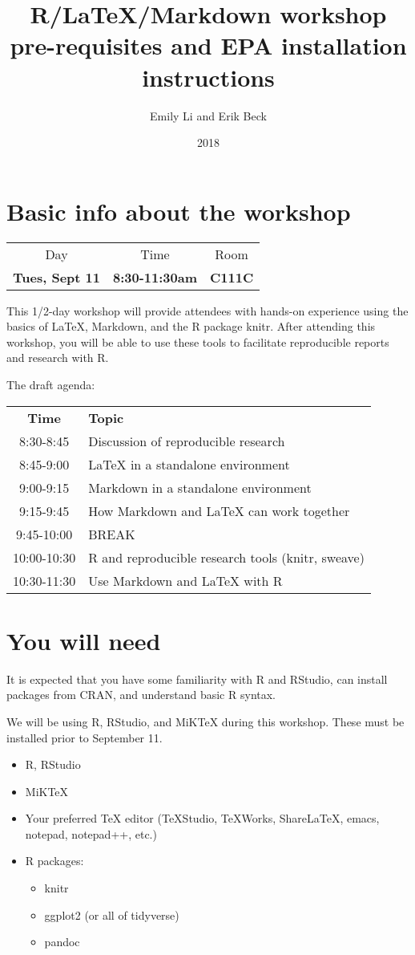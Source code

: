 \documentclass{article}
\title{R/LaTeX/Markdown workshop pre-requisites and EPA installation instructions}
\author{Emily Li and Erik Beck}
\date{2018}
\begin{document}
\maketitle
\tableofcontents

\section{Basic info about the workshop}
\begin{center}
    \begin{tabular}{c c c}
    Day & Time & Room \\
    \textbf{Tues, Sept 11} & \textbf{8:30-11:30am} & \textbf{C111C}
\end{tabular}
\end{center}

This 1/2-day workshop will provide attendees with hands-on experience
using the basics of LaTeX, Markdown, and the R package knitr. After
attending this workshop, you will be able to use these tools to
facilitate reproducible reports and research with R.

The draft agenda:

\begin{tabular}{c|l}
    \textbf{Time} & \textbf{Topic} \\
    8:30-8:45 & Discussion of reproducible research \\
    8:45-9:00 & LaTeX in a standalone environment \\
    9:00-9:15 & Markdown in a standalone environment \\
    9:15-9:45 & How Markdown and LaTeX can work together \\
    9:45-10:00 & BREAK \\
    10:00-10:30 & R and reproducible research tools (knitr, sweave) \\
    10:30-11:30 & Use Markdown and LaTeX with R
\end{tabular}

\section{You will need}
It is expected that you have some familiarity with R and RStudio, can
install packages from CRAN, and understand basic R syntax.

We will be using R, RStudio, and MiKTeX during this workshop. These must be installed prior to September 11.
\begin{itemize}
    \item R, RStudio
    \item MiKTeX
    \item Your preferred TeX editor (TeXStudio, TeXWorks, ShareLaTeX, emacs, notepad, notepad++, etc.)
    \item R packages:
    \begin{itemize}
        \item knitr
        \item ggplot2 (or all of tidyverse)
        \item pandoc
    \end{itemize}
\end{itemize}
\end{document}
